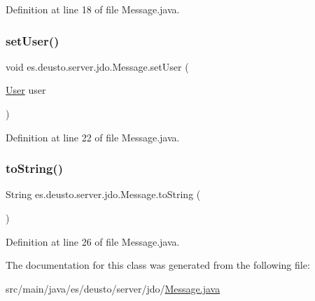 Definition at line 18 of file Message.\+java.

\mbox{\label{classes_1_1deusto_1_1server_1_1jdo_1_1_message_aa14eb8300d45fc649c72410f2695fbfd}} 
\subsubsection{\texorpdfstring{setUser()}{setUser()}}
{\footnotesize\ttfamily void es.\+deusto.\+server.\+jdo.\+Message.\+set\+User (\begin{DoxyParamCaption}\item[{\mbox{\hyperlink{classes_1_1deusto_1_1server_1_1jdo_1_1_user}{User}}}]{user }\end{DoxyParamCaption})}



Definition at line 22 of file Message.\+java.

\mbox{\label{classes_1_1deusto_1_1server_1_1jdo_1_1_message_adb83e70d5da34c39954e6d7d418aa386}} 
\subsubsection{\texorpdfstring{toString()}{toString()}}
{\footnotesize\ttfamily String es.\+deusto.\+server.\+jdo.\+Message.\+to\+String (\begin{DoxyParamCaption}{ }\end{DoxyParamCaption})}



Definition at line 26 of file Message.\+java.



The documentation for this class was generated from the following file\+:\begin{DoxyCompactItemize}
\item 
src/main/java/es/deusto/server/jdo/\mbox{\hyperlink{_message_8java}{Message.\+java}}\end{DoxyCompactItemize}
